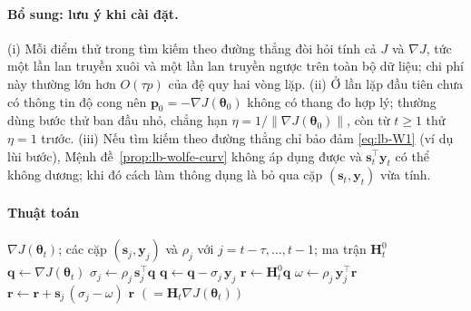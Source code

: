 \paragraph{Bổ sung: lưu ý khi cài đặt.}
(i) Mỗi điểm thử trong tìm kiếm theo đường thẳng đòi hỏi tính cả $J$ và $\nabla J$, tức một lần lan truyền xuôi và một lần lan truyền ngược trên toàn bộ dữ liệu; chi phí này thường lớn hơn $O(\tau p)$ của đệ quy hai vòng lặp. (ii) Ở lần lặp đầu tiên chưa có thông tin độ cong nên $\mathbf{p}_0=-\nabla J(\boldsymbol{\theta}_0)$ không có thang đo hợp lý; thường dùng bước thử ban đầu nhỏ, chẳng hạn $\eta=1/\|\nabla J(\boldsymbol{\theta}_0)\|$, còn từ $t\ge1$ thử $\eta=1$ trước. (iii) Nếu tìm kiếm theo đường thẳng chỉ bảo đảm \eqref{eq:lb-W1} (ví dụ lùi bước), Mệnh đề~\ref{prop:lb-wolfe-curv} không áp dụng được và $\mathbf{s}_t^{\top}\mathbf{y}_t$ có thể không dương; khi đó cách làm thông dụng là bỏ qua cặp $(\mathbf{s}_t,\mathbf{y}_t)$ vừa tính.


\paragraph{Thuật toán}

\begin{algorithm}[H]
\caption{Đệ quy hai vòng lặp tính $\mathbf{H}_t\nabla J(\boldsymbol{\theta}_t)$}\label{alg:lb-twoloop}
\begin{algorithmic}[1]
\Require $\nabla J(\boldsymbol{\theta}_t)$; các cặp $(\mathbf{s}_j,\mathbf{y}_j)$ và $\rho_j$ với $j=t-\tau,\dots,t-1$; ma trận $\mathbf{H}_t^{0}$
\State $\mathbf{q}\gets\nabla J(\boldsymbol{\theta}_t)$
  \State $\sigma_j\gets\rho_j\,\mathbf{s}_j^{\top}\mathbf{q}$
  \State $\mathbf{q}\gets\mathbf{q}-\sigma_j\,\mathbf{y}_j$
\EndFor
\State $\mathbf{r}\gets\mathbf{H}_t^{0}\mathbf{q}$
  \State $\omega\gets\rho_j\,\mathbf{y}_j^{\top}\mathbf{r}$
  \State $\mathbf{r}\gets\mathbf{r}+\mathbf{s}_j\,(\sigma_j-\omega)$
\EndFor
\State \Return $\mathbf{r}$ \hfill $(=\mathbf{H}_t\nabla J(\boldsymbol{\theta}_t))$
\end{algorithmic}
\end{algorithm}

